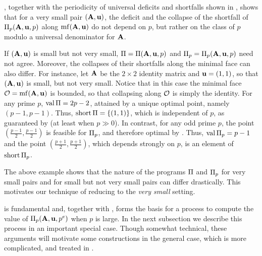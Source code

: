 \documentclass{amsart}
\begin{document}
\begin{remark} \label{program behavior small: R}
   , together with the periodicity of universal deficits and shortfalls shown in , shows that for a very small pair $(\mathbf{A},\mathbf{u})$, the deficit and the collapse of the shortfall of  $\Pi_p(\mathbf{A},\mathbf{u},p)$ along $\operatorname{mf}(\mathbf{A}, \mathbf{u})$ do not depend on $p$,  but rather on the class of $p$ modulo a universal denominator for $\mathbf{A}$.
\end{remark}

\begin{example}
   If $(\mathbf{A}, \mathbf{u})$ is small but not very small, $\Pi = \Pi(\mathbf{A},\mathbf{u},p)$ and $\Pi_p = \Pi_p(\mathbf{A},\mathbf{u},p)$ need not agree.
   Moreover, the collapses of their shortfalls along the minimal face can also differ.
   For instance, let $\mathbf{A}$ be the $2 \times 2$ identity matrix and $\mathbf{u} = (1,1)$, so that $(\mathbf{A},\mathbf{u})$ is small, but not very small.
   Notice that in this case the minimal face $\mathcal{O} = \operatorname{mf}(\mathbf{A},\mathbf{u})$ is bounded, so that collapsing along $\mathcal{O}$ is simply the identity.
   For any prime $p$, $\operatorname{val} \Pi = 2p - 2$, attained by a unique optimal point, namely $(p-1,p-1)$.
   Thus, $\operatorname{short} \Pi = \{(1,1)\}$, which is independent of $p$, as guaranteed by   (at least when $p \gg 0$).
   In contrast, for any odd prime $p$, the point $(\frac{p-1}{2}, \frac{p-1}{2})$ is feasible for $\Pi_p$, and therefore optimal by .
   Thus, $\operatorname{val} \Pi_p = p-1$ and the point $(\frac{p+1}{2}, \frac{p+1}{2})$, which depends strongly on $p$, is an element of $\operatorname{short} \Pi_p$.
\end{example}

The above example shows that the nature of the programs $\Pi$ and $\Pi_p$ for very small pairs and for small but not very small pairs can differ drastically.
This motivates our technique of reducing to the \emph{very small} setting.

 is fundamental and, together with , forms the basis for a process to compute the value of $\Pi_p(\mathbf{A}, \mathbf{u}, p^e)$ when $p$ is large.  
In the next subsection we describe this process in an important special case.  Though somewhat technical, these arguments will motivate some constructions in the general case, which is more complicated, and treated in .
\end{document}
